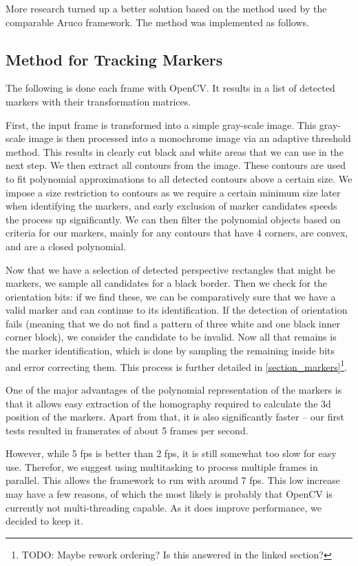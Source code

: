 More research turned up a better solution based on the method used by the comparable Aruco\cite{aruco} framework.
The method was implemented as follows.

\subsection{Method for Tracking Markers}

The following is done each frame with OpenCV.
It results in a list of detected markers with their transformation matrices.

First, the input frame is transformed into a simple gray-scale image.
This gray-scale image is then processed into a monochrome image via an adaptive threshold method.
This results in clearly cut black and white areas that we can use in the next step.
We then extract all contours from the image.
These contours are used to fit polynomial approximations to all detected contours above a certain size.
We impose a size restriction to contours as we require a certain minimum size later when identifying the markers, and early exclusion of marker candidates speeds the process up significantly.
We can then filter the polynomial objects based on criteria for our markers, mainly for any contours that have 4 corners, are convex, and are a closed polynomial.

Now that we have a selection of detected perspective rectangles that might be markers, we sample all candidates for a black border.
Then we check for the orientation bits: if we find these, we can be comparatively sure that we have a valid marker and can continue to its identification.
If the detection of orientation fails (meaning that we do not find a pattern of three white and one black inner corner block), we consider the candidate to be invalid.
Now all that remains is the marker identification, which is done by sampling the remaining inside bits and error correcting them.
This process is further detailed in \ref{section_markers}\footnote{TODO: Maybe rework ordering? Is this answered in the linked section?}.

One of the major advantages of the polynomial representation of the markers is that it allows easy extraction of the homography required to calculate the 3d position of the markers.
Apart from that, it is also significantly faster – our first tests resulted in framerates of about 5 frames per second.

However, while 5 fps is better than 2 fps, it is still somewhat too slow for easy use.
Therefor, we suggest using multitasking to process multiple frames in parallel.
This allows the framework to run with around 7 fps.
This low increase may have a few reasons, of which the most likely is probably that OpenCV is currently not multi-threading capable.
As it does improve performance, we decided to keep it.

